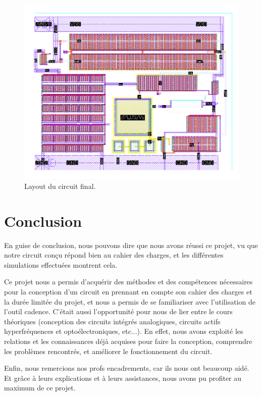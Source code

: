 \documentclass[a4paper,12pt]{article}
\numberwithin{equation}{section}
\newcommand{\?}{\stackrel{?}{=}}
\begin{document}
\begin{figure}[htp!]
    \centering
    \includegraphics[width=\linewidth]{images/layout_fig.png}
    \caption{Layout du circuit final.}
    \label{fig:layout_fig}
\end{figure}

\FloatBarrier
\newpage
\section{Conclusion}

En guise de conclusion, nous pouvons dire que nous avons réussi ce projet, vu que notre circuit conçu répond bien au cahier des charges, et les différentes simulations effectuées montrent cela. 

Ce projet nous a permis d'acquérir des méthodes et des compétences nécessaires pour la conception d'un circuit en prennant en compte son cahier des charges et la durée limitée du projet, et nous a permis de se familiariser avec l'utilisation de l'outil cadence. C'était aussi l'opportunité pour nous de lier entre le cours théoriques (conception des circuits intégrés analogiques, circuits actifs hyperfréquences et optoélectroniques, etc...). En effet, nous avons exploité les relations et les connaissances déjà acquises pour faire la conception, comprendre les problèmes rencontrés, et améliorer le fonctionnement du circuit.

Enfin, nous remercions nos profs encadrements, car ils nous ont beaucoup aidé. Et grâce à leurs explications et à leurs assistances, nous avons pu profiter au maximum de ce projet.
\end{document}
